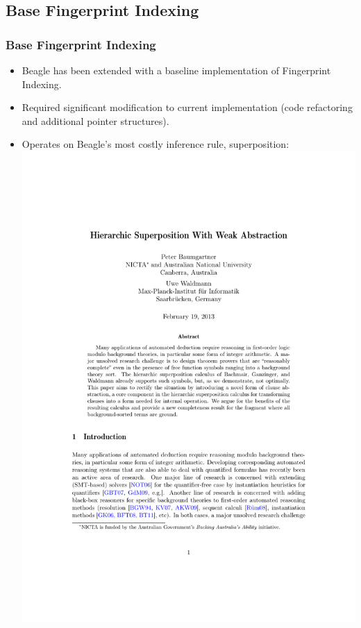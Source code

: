 \documentclass[10pt]{beamer}
\begin{document}
\begin{NoHyper}
\subsection{Base Fingerprint Indexing}
\begin{frame}
  \frametitle{Base Fingerprint Indexing}
  \begin{itemize}
  \item<1-> Beagle has been extended with a baseline implementation of Fingerprint
  Indexing.
  \item<2-> Required significant modification to current implementation
  (code refactoring and additional pointer structures).
  \item<3-> Operates on Beagle's most costly inference rule, superposition:\\
  \hspace{2cm}\includegraphics[page=11,scale=1,trim=9.5cm 22.7cm 5cm 5.4cm,clip]{report}


\end{itemize}
\end{frame}
\end{NoHyper}
\end{document}
